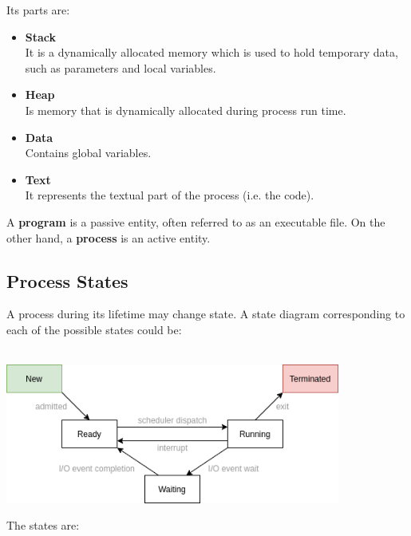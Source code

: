 \documentclass{article}
\begin{document}
Its parts are:
\begin{itemize}
	\item \textbf{Stack}
	\vspace{.2cm} \\
	It is a dynamically allocated memory which is used to hold temporary data, such as parameters and local variables.
	
	\item \textbf{Heap}
	\vspace{.2cm} \\
	Is memory that is dynamically allocated during process run time.
	
	\item \textbf{Data}
	\vspace{.2cm} \\
	Contains global variables.
	
	\item \textbf{Text}
	\vspace{.2cm} \\
	It represents the textual part of the process (i.e. the code).
\end{itemize}
A \textbf{program} is a passive entity, often referred to as an executable file. On the other hand, a \textbf{process} is an active entity.

\subsection{Process States}
A process during its lifetime may change state. A state diagram corresponding to each of the possible states could be: \\ \\

\centerline{\includegraphics[width=11cm]{./assets/state.png}}
\vspace{.5cm}
The states are:
\end{document}
